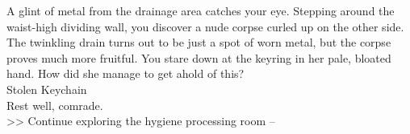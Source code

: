 A glint of metal from the drainage area catches your eye. Stepping around the waist-high dividing wall, you discover a nude corpse curled up on the other side.\\

The twinkling drain turns out to be just a spot of worn metal, but the corpse proves much more fruitful. You stare down at the keyring in her pale, bloated hand. How did she manage to get ahold of this?\\
 Stolen Keychain\\

Rest well, comrade.\\

>> Continue exploring the hygiene processing room -- 